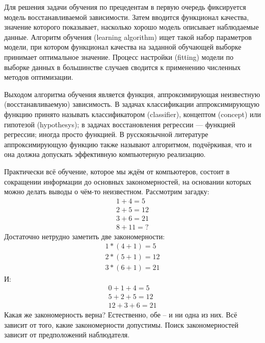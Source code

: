 \documentclass[a4paper, 12pt]{article}
\begin{document}
	Для решения задачи обучения по прецедентам в первую очередь фиксируется модель восстанавливаемой зависимости. Затем вводится функционал качества, значение которого показывает, насколько хорошо модель описывает наблюдаемые данные. Алгоритм обучения (learning algorithm) ищет такой набор параметров модели, при котором функционал качества на заданной обучающей выборке принимает оптимальное значение. Процесс настройки (fitting) модели по выборке данных в большинстве случаев сводится к применению численных методов оптимизации.
	
    Выходом алгоритма обучения является функция, аппроксимирующая неизвестную (восстанавливаемую) зависимость. В задачах классификации аппроксимирующую функцию принято называть классификатором (classifier), концептом (concept) или гипотезой (hypothesys); в задачах восстановления регрессии — функцией регрессии; иногда просто функцией. В русскоязычной литературе аппроксимирующую функцию также называют алгоритмом, подчёркивая, что и она должна допускать эффективную компьютерную реализацию.
	
	Практически всё обучение, которое мы ждём от компьютеров, состоит в сокращении информации до основных закономерностей, на основании которых можно делать выводы о чём-то неизвестном. Рассмотрим загадку:
	\begin{equation*}
		\begin{gathered}
		1 + 4 = 5\\
		2 + 5 = 12\\
		3 + 6 = 21\\
		8 + 11 =?
		\end{gathered}
	\end{equation*}
	Достаточно нетрудно заметить две закономерности:
	\begin{equation*}
		\begin{gathered}
		1 * (4 + 1) = 5\\
		2 * (5 + 1) = 12\\
		3 * (6 + 1) = 21
		\end{gathered}
	\end{equation*}
	И:
	\begin{equation*}
		\begin{gathered}
		0 + 1 + 4 = 5\\
		5 + 2 + 5 = 12\\
		12 + 3 + 6 = 21
		\end{gathered}
	\end{equation*}
	Какая же закономерность верна? Естественно, обе – и ни одна из них. Всё зависит от того, какие закономерности допустимы. Поиск закономерностей зависит от предположений наблюдателя.
\end{document}
